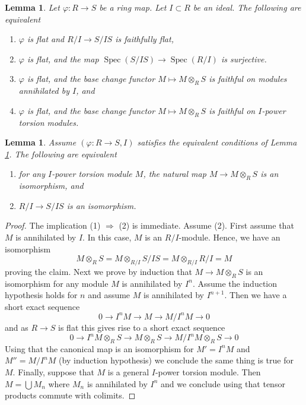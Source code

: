 \documentclass[10pt,a4paper]{amsart}
\theoremstyle{plain}
\newtheorem{lemma}[subsection]{Lemma}
\theoremstyle{definition}
\theoremstyle{remark}
\numberwithin{equation}{subsection}
\def\Spec{\mathop{\mathrm{Spec}}}
\begin{document}
\begin{lemma}
\label{lemma-characterize-flatness-on-torsion}
Let $\varphi : R \to S$ be a ring map. Let $I \subset R$ be an ideal.
The following are equivalent
\begin{enumerate}
\item $\varphi$ is flat and $R/I \to S/IS$ is faithfully flat,
\item $\varphi$ is flat, and the map
$\Spec(S/IS) \to \Spec(R/I)$ is surjective.
\item $\varphi$ is flat, and the base change functor
$M \mapsto M \otimes_R S$ is faithful on modules annihilated by $I$, and
\item $\varphi$ is flat, and the base change functor
$M \mapsto M \otimes_R S$ is faithful on $I$-power torsion modules.
\end{enumerate}
\end{lemma}

\begin{lemma}
\label{lemma-neighbourhood-isomorphism}
Assume $(\varphi : R \to S, I)$ satisfies the equivalent conditions of
Lemma \ref{lemma-characterize-flatness-on-torsion}.
The following are equivalent
\begin{enumerate}
\item for any $I$-power torsion module $M$, the natural map
$M \to M \otimes_R S$ is an isomorphism, and
\item $R/I \to S/IS$ is an isomorphism.
\end{enumerate}
\end{lemma}

\begin{proof}
The implication (1) $\Rightarrow$ (2) is immediate.
Assume (2). First assume that $M$ is annihilated by $I$.
In this case, $M$ is an $R/I$-module. Hence, we have an isomorphism
$$
M \otimes_R S = M \otimes_{R/I} S/IS = M \otimes_{R/I} R/I = M
$$
proving the claim. Next we prove by induction that $M \to M \otimes_R S$
is an isomorphism for any module $M$ is annihilated by $I^n$. Assume
the induction hypothesis holds for $n$ and assume $M$ is annihilated by
$I^{n + 1}$. Then we have a short exact sequence
$$
0 \to I^nM \to M \to M/I^nM \to 0
$$
and as $R \to S$ is flat this gives rise to a short exact sequence
$$
0 \to I^nM \otimes_R S \to M \otimes_R S \to M/I^nM \otimes_R S \to 0
$$
Using that the canonical map is an isomorphism for $M' = I^nM$ and
$M'' = M/I^nM$ (by induction hypothesis) we conclude the same thing is
true for $M$. Finally, suppose that $M$ is a general $I$-power torsion
module. Then $M = \bigcup M_n$ where $M_n$ is annihilated by $I^n$
and we conclude using that tensor products commute with colimits.
\end{proof}
\end{document}
